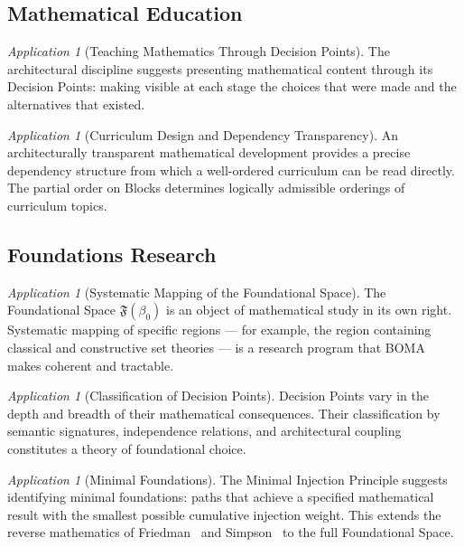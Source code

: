 \documentclass[12pt, a4paper]{article}
\theoremstyle{plain}
\theoremstyle{definition}
\theoremstyle{remark}
\newtheorem{application}[theorem]{Application}
\newcommand{\FS}[1]{\mathfrak{F}(#1)}
\newcommand{\BOMA}{\textsf{BOMA}}
\begin{document}
\subsection{Mathematical Education}
\label{subsec:education}

\begin{application}[Teaching Mathematics Through Decision Points]
\label{app:education}
The architectural discipline suggests presenting mathematical content
through its Decision Points: making visible at each stage the choices
that were made and the alternatives that existed.
\end{application}

\begin{application}[Curriculum Design and Dependency Transparency]
\label{app:curriculum}
An architecturally transparent mathematical development provides a
precise dependency structure from which a well-ordered curriculum can
be read directly. The partial order on Blocks determines logically
admissible orderings of curriculum topics.
\end{application}

\subsection{Foundations Research}
\label{subsec:foundations-research}

\begin{application}[Systematic Mapping of the Foundational Space]
\label{app:mapping}
The Foundational Space $\FS{\beta_0}$ is an object of mathematical study
in its own right. Systematic mapping of specific regions --- for
example, the region containing classical and constructive set theories
--- is a research program that \BOMA{} makes coherent and tractable.
\end{application}

\begin{application}[Classification of Decision Points]
\label{app:classification}
Decision Points vary in the depth and breadth of their mathematical
consequences. Their classification by semantic signatures,
independence relations, and architectural coupling constitutes a
theory of foundational choice.
\end{application}

\begin{application}[Minimal Foundations]
\label{app:minimal}
The Minimal Injection Principle suggests identifying minimal
foundations: paths that achieve a specified mathematical result with
the smallest possible cumulative injection weight. This extends the
reverse mathematics of Friedman~\cite{Friedman1975} and Simpson~\cite{Simpson2009}
to the full Foundational Space.
\end{application}
\end{document}
